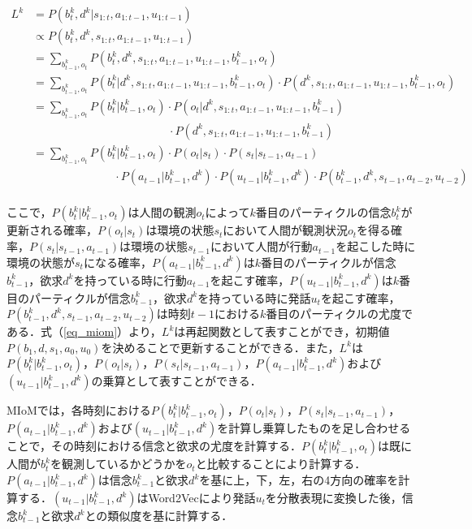 \begin{equation}
  \begin{split}
  \label{eq_miom}
  L^k&=P(b_t^k,d^k|s_{1:t},a_{1:t-1},u_{1:t-1})\\
  &\propto P(b_t^k,d^k,s_{1:t},a_{1:t-1},u_{1:t-1})\\
  &= \sum_{b_{t-1}^k,o_t}P(b_t^k,d^k,s_{1:t},a_{1:t-1},u_{1:t-1},b_{t-1}^k,o_t)\\
  &= \sum_{b_{t-1}^k,o_t}P(b_t^k|d^k,s_{1:t},a_{1:t-1},u_{1:t-1},b_{t-1}^k,o_t)\cdot P(d^k,s_{1:t},a_{1:t-1},u_{1:t-1},b_{t-1}^k,o_t)\\
  &= \sum_{b_{t-1}^k,o_t}P(b_t^k|b_{t-1}^k,o_t)\cdot P(o_t|d^k,s_{1:t},a_{1:t-1},u_{1:t-1},b_{t-1}^k)\\
  &\hspace{5cm} \cdot P(d^k,s_{1:t},a_{1:t-1},u_{1:t-1},b_{t-1}^k)\\
  &= \sum_{b_{t-1}^k,o_t}P(b_t^k|b_{t-1}^k,o_t)\cdot P(o_t|s_t)\cdot P(s_t|s_{t-1},a_{t-1})\\
  &\hspace{3cm} \cdot P(a_{t-1}|b_{t-1}^k,d^k)\cdot P(u_{t-1}|b_{t-1}^k,d^k)\cdot P(b_{t-1}^k,d^k,s_{t-1},a_{t-2},u_{t-2})\\
  \end{split}
\end{equation}


ここで，$P(b_t^k|b_{t-1}^k,o_t)$は人間の観測$o_t$によって$k$番目のパーティクルの信念$b_t^k$が更新される確率，$P(o_t|s_t)$は環境の状態$s_t$において人間が観測状況$o_t$を得る確率，$P(s_t|s_{t-1},a_{t-1})$は環境の状態$s_{t-1}$において人間が行動$a_{t-1}$を起こした時に環境の状態が$s_{t}$になる確率，$P(a_{t-1}|b_{t-1}^k,d^k)$は$k$番目のパーティクルが信念$b_{t-1}^k$，欲求$d^k$を持っている時に行動$a_{t-1}$を起こす確率，$P(u_{t-1}|b_{t-1}^k,d^k)$は$k$番目のパーティクルが信念$b_{t-1}^k$，欲求$d^k$を持っている時に発話$u_t$を起こす確率，$P(b_{t-1}^k,d^k,s_{t-1},a_{t-2},u_{t-2})$は時刻$t-1$における$k$番目のパーティクルの尤度である．式（\ref{eq_miom}）より，$L^k$は再起関数として表すことができ，初期値$P(b_1,d,s_1,a_0,u_0)$を決めることで更新することができる．また，$L^k$は$P(b_t^k|b_{t-1}^k,o_t)$，$P(o_t|s_t)$，$P(s_t|s_{t-1},a_{t-1})$，$P(a_{t-1}|b_{t-1}^k,d^k)$および$(u_{t-1}|b_{t-1}^k,d^k)$の乗算として表すことができる．

\par
MIoMでは，各時刻における$P(b_t^k|b_{t-1}^k,o_t)$，$P(o_t|s_t)$，$P(s_t|s_{t-1},a_{t-1})$，$P(a_{t-1}|b_{t-1}^k,d^k)$および$(u_{t-1}|b_{t-1}^k,d^k)$を計算し乗算したものを足し合わせることで，その時刻における信念と欲求の尤度を計算する．$P(b_t^k|b_{t-1}^k,o_t)$は既に人間が$b_t^k$を観測しているかどうかを$o_t$と比較することにより計算する．
$P(a_{t-1}|b_{t-1}^k,d^k)$は信念$b_{t-1}^k$と欲求$d^k$を基に上，下，左，右の4方向の確率を計算する．$(u_{t-1}|b_{t-1}^k,d^k)$はWord2Vecにより発話$u_t$を分散表現に変換した後，信念$b_{t-1}^k$と欲求$d^k$との類似度を基に計算する．
